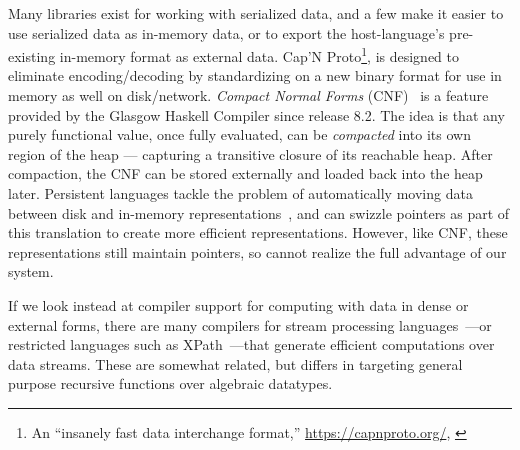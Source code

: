 \documentclass[showabstract,showacknowledgments,showpreface,showdedication]{iuphd}
\theoremstyle{nonumberplain}
\newcommand{\il}[1]{\lstinline[style=inline,mathescape=true];#1;}
\begin{document}
Many libraries exist for working with serialized data, and a few
make it easier to use serialized data as in-memory data, or to export the
host-language's pre-existing in-memory format as external data.
Cap'N Proto\footnote{An ``insanely fast data interchange format,''
  \url{https://capnproto.org/}, \cite{capnproto}},
is designed to eliminate encoding/decoding by
standardizing on a new binary format for use in memory as well on disk/network.
%
%
{\em Compact Normal Forms} (CNF)~\cite{cnf-icfp15} is 
a feature provided by the Glasgow Haskell Compiler since release 8.2.  
%
%
The idea is that any purely functional value, once fully evaluated, can be {\em compacted}
into its own region of the heap
--- capturing a transitive closure of its reachable heap.
After compaction, the CNF can be stored externally and loaded
back into the heap later.
%
{Persistent languages tackle the problem of automatically moving data between disk 
and in-memory representations~\cite{persistent-java,persistent-object-systems,persistent-objects-thor}, and can swizzle pointers as part of this 
translation to create more efficient representations. However, like CNF, these 
representations still maintain pointers, so cannot realize the full advantage of 
our system.}

If we look instead at compiler support for computing with data in dense or
external forms, there are many compilers for stream processing
languages~\cite{streamit,wavescript-nsdi}---or restricted languages such as
XPath~\cite{xpath-streams}---that generate efficient computations over data
streams.
These are somewhat related, but \ourcalc differs in targeting general
purpose recursive functions over algebraic datatypes.
%
\end{document}
